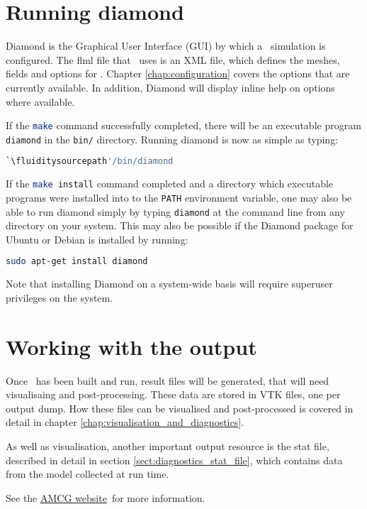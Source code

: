 \section{Running diamond}
\label{sect:running_diamond}

Diamond is the Graphical User Interface (GUI) by which a \fluidity\ simulation is 
configured. The flml file that \fluidity\ uses is an XML file, which defines the
meshes, fields and options for \fluidity. Chapter \ref{chap:configuration} covers 
the options that are currently available. In addition, Diamond will display inline
help on options where available.

If the \lstinline[language=Bash]+make+ command successfully completed, there will be an
executable program \lstinline[language=Bash]+diamond+ in the
\lstinline[language=Bash]+bin/+ directory. Running diamond is now as simple as
typing:

\begin{lstlisting}[language=Bash]
`\fluiditysourcepath'/bin/diamond
\end{lstlisting}

If the \lstinline[language=Bash]+make install+ command completed and a directory
which executable programs were installed into to the
\lstinline[language=Bash]+PATH+ environment variable, one may also be able to run
diamond simply by typing \lstinline[language=Bash]+diamond+ at the command line
from any directory on your system. This may also be possible if the
Diamond package for Ubuntu or Debian is installed by running:

\begin{lstlisting}[language=Bash]
sudo apt-get install diamond
\end{lstlisting}

Note that installing Diamond on a system-wide basis will require superuser privileges on the system.

\section{Working with the output}
\label{sect:working_with_output}

Once \fluidity\ has been built and run, result files will be generated, that will need visualisaing
and post-processing. These data are stored in VTK files, one per output dump. 
How these files can be visualised and post-processed is covered in detail in chapter
\ref{chap:visualisation_and_diagnostics}.

As well as visualisation, another important output resource is the stat file,
described in detail in section \ref{sect:diagnostics_stat_file}, which contains data from the model
collected at run time.

See the \href{http://amcg-www.ese.ic.ac.uk/}{AMCG website}\ for more information.




